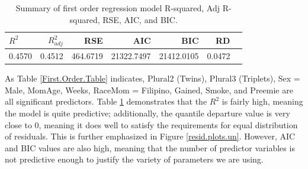 \documentclass{article}\usepackage[]{graphicx}\usepackage[]{xcolor}
\begin{document}
\begin{table}[H]
\centering
\begin{tabular}{lrrrrrr}
  \hline
$R^2$ & $R^2_{adj}$ & RSE & AIC & BIC & RD\\ 
  \hline
   0.4570 & 0.4512 & 464.6719 & 21322.7497 & 21412.0105 & 0.0472 \\ 
   \hline
\end{tabular}
\caption{Summary of first order regression model R-squared, Adj R-squared, RSE, AIC, and BIC.}
\label{first.order.summary}
\end{table}

As Table \ref{First.Order.Table} indicates, Plural2 (Twins), Plural3 (Triplets), Sex = Male, MomAge, Weeks, RaceMom = Filipino, Gained, Smoke, and Preemie are all significant predictors. Table \ref{first.order.summary} demonstrates that the $R^2$ is fairly high, meaning the model is quite predictive; additionally, the quantile departure value is very close to 0, meaning it does well to satisfy the requirements for equal distribution of residuals. This is further emphasized in Figure \ref{resid.plots.un}. However, AIC and BIC values are also high, meaning that the number of predictor variables is not predictive enough to justify the variety of parameters we are using.
\end{document}
